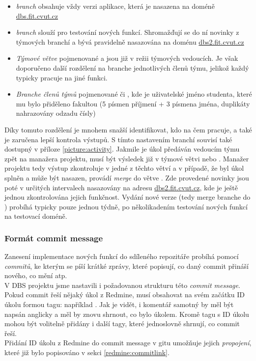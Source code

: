 \begin{itemize}
	\item \emph{ branch} obsahuje vždy verzi aplikace, která je nasazena na doméně \url{dbs.fit.cvut.cz}
	\item \emph{ branch} slouží pro testování nových funkcí. Shromažďují se do ní novinky z týmových branchí a bývá pravidelně nasazována na doménu \url{dbs2.fit.cvut.cz}
	\item \emph{Týmové větve} pojmenované  a  jsou již v režii týmových vedoucích. Je však doporučeno další rozdělení na branche jednotlivých členů týmu, jelikož každý typicky pracuje na jiné funkci.
	\item \emph{Branche členů týmů} pojmenované  či , kde  je uživatelské jméno studenta, které mu bylo přiděleno fakultou (5 písmen příjmení + 3 písmena jména, duplikáty nahrazovány odzadu čísly)
\end{itemize}
Díky tomuto rozdělení je mnohem snažší identifikovat, kdo na čem pracuje, a také je zaručena lepší kontrola výstupů. S tímto nastavením branchí souvisí také  dostupný v příloze \ref{picture:activity}. Jakmile je úkol předáván vedoucím týmu zpět na manažera projektu, musí být výsledek již v týmové větvi  nebo . Manažer projektu tedy výstup zkontroluje v jedné z těchto větví a v případě, že byl úkol splněn a může být nasazen, provádí \emph{merge} do větve . Zde provedené novinky jsou poté v určitých intervalech nasazovány na adresu \url{dbs2.fit.cvut.cz}, kde je ještě jednou zkontrolována jejich funkčnost. Vydání nové verze (tedy merge branche  do ) probíhá typicky pouze jednou týdně, po několikadením testování nových funkcí na testovací doméně.

\subsubsection{Formát commit message} \label{version:git:commit}
Zanesení implementace nových funkcí do sdíleného repozitáře probíhá pomocí \emph{commitů}, ke kterým se píší krátké zprávy, které popisují, co daný commit přináší nového, co mění atp.\\
V DBS projektu jsme nastavili i požadovanou strukturu této \emph{commit message}. Pokud commit řeší nějaký úkol z Redmine, musí obsahovat na svém začátku ID úkolu formou tagu: například . Jak je vidět, i komentář samotný by měl být napsán anglicky a měl by znovu shrnout, co bylo úkolem. Kromě tagu s ID úkolu mohou být volitelně přidány i další tagy, které jednoslovně shrnují, co commit řeší.\\
Přidání ID úkolu z Redmine do commit message v gitu umožňuje jejich \emph{propojení}, které již bylo popisováno v sekci \ref{redmine:commitlink}.

